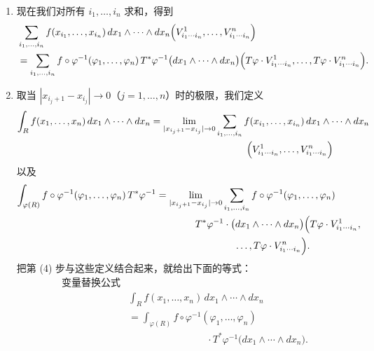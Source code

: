 \begin{enumerate}
  \begin{align*}
  &f(x_{i_1},\ldots,x_{i_n})\,dx_1\wedge\cdots\wedge dx_n\Bigl(V^1_{i_1\cdots i_n},\ldots,V^n_{i_1\cdots i_n}\Bigr)\\
  &=f\circ\varphi^{-1}\circ\varphi(x_{i_1},\ldots,x_{i_n})\,T^*\varphi^{-1}\cdot\bigl(dx_1\wedge\cdots\wedge dx_n\bigr)\Bigl(T\varphi\cdot V^1_{i_1\cdots i_n},\ldots,T\varphi\cdot V^n_{i_1\cdots i_n}\Bigr)\\
  &=f\circ\varphi^{-1}(\varphi_1,\ldots,\varphi_n)\,T^*\varphi^{-1}\cdot\bigl(dx_1\wedge\cdots\wedge dx_n\bigr)\Bigl(T\varphi\cdot V^1_{i_1\cdots i_n},\ldots,T\varphi\cdot V^n_{i_1\cdots i_n}\Bigr).
  \end{align*}
  注意，在上面最后一个等式中我们写
  \[
  \varphi(x_{i_1},\ldots,x_{i_n})=\Bigl(\varphi_1(x_{i_1},\ldots,x_{i_n}),\ldots,\varphi_n(x_{i_1},\ldots,x_{i_n})\Bigr)=(\varphi_1,\ldots,\varphi_n).
  \]
  \item 现在我们对所有 $i_1,\ldots,i_n$ 求和，得到
  \begin{align*}
  &\sum_{i_1,\ldots,i_n}f(x_{i_1},\ldots,x_{i_n})\,dx_1\wedge\cdots\wedge dx_n\Bigl(V^1_{i_1\cdots i_n},\ldots,V^n_{i_1\cdots i_n}\Bigr)\\
  &=\sum_{i_1,\ldots,i_n}f\circ\varphi^{-1}(\varphi_1,\ldots,\varphi_n)\,T^*\varphi^{-1}\bigl(dx_1\wedge\cdots\wedge dx_n\bigr)\Bigl(T\varphi\cdot V^1_{i_1\cdots i_n},\ldots,T\varphi\cdot V^n_{i_1\cdots i_n}\Bigr).
  \end{align*}
  \item 取当 $|x_{i_j+1}-x_{i_j}|\to 0$（$j=1,\ldots,n$）时的极限，我们定义
  \[
  \begin{aligned}
  \int_R f(x_1,\ldots,x_n)\,dx_1\wedge\cdots\wedge dx_n
  &=\lim_{|x_{i_j+1}-x_{i_j}|\to 0}\sum_{i_1,\ldots,i_n}f(x_{i_1},\ldots,x_{i_n})\,dx_1\wedge\cdots\wedge dx_n\\
  &\qquad\qquad\qquad\qquad\qquad\Bigl(V^1_{i_1\cdots i_n},\ldots,V^n_{i_1\cdots i_n}\Bigr)
  \end{aligned}
  \]
  以及
  \[
  \begin{aligned}
  \int_{\varphi(R)}f\circ\varphi^{-1}(\varphi_1,\ldots,\varphi_n)\,T^*\varphi^{-1}
  &=\lim_{|x_{i_j+1}-x_{i_j}|\to 0}\sum_{i_1,\ldots,i_n}f\circ\varphi^{-1}(\varphi_1,\ldots,\varphi_n)\\
  &\qquad\qquad T^*\varphi^{-1}\cdot\bigl(dx_1\wedge\cdots\wedge dx_n\bigr)\Bigl(T\varphi\cdot V^1_{i_1\cdots i_n},\\
  &\qquad\qquad\qquad\qquad\ldots,T\varphi\cdot V^n_{i_1\cdots i_n}\Bigr).
  \end{aligned}
  \]
  把第 (4) 步与这些定义结合起来，就给出下面的等式：
  \[
  \begin{aligned}
  \text{变量替换公式}\\
  &\int_R f(x_1,\ldots,x_n)\,dx_1\wedge\cdots\wedge dx_n\\
  &=\int_{\varphi(R)}f\circ\varphi^{-1}(\varphi_1,\ldots,\varphi_n)\\
  &\qquad\qquad\qquad\qquad\cdot T^*\varphi^{-1}\bigl(dx_1\wedge\cdots\wedge dx_n\bigr).
  \end{aligned}
  \]
\end{enumerate}


